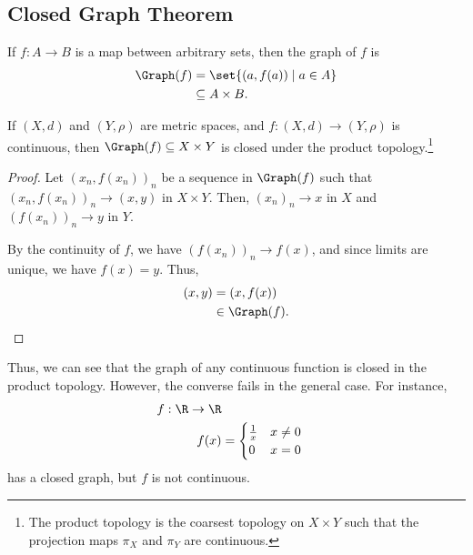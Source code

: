 \documentclass[10pt]{mypackage}
\begin{document}
  \subsection{Closed Graph Theorem}%
  \begin{definition}
    If $f: A\rightarrow B$ is a map between arbitrary sets, then the graph of $f$ is
    \begin{align*}
      \Graph(f) &= \set{\left(a,f(a)\right)\mid a\in A}\\
                &\subseteq A\times B.
    \end{align*}
  \end{definition}
  \begin{proposition}
    If $\left(X,d\right)$ and $\left(Y,\rho\right)$ are metric spaces, and $f: \left(X,d\right)\rightarrow \left(Y,\rho\right)$ is continuous, then $\Graph(f) \subseteq X\times Y$ is closed under the product topology.\footnote{The product topology is the coarsest topology on $X\times Y$ such that the projection maps $\pi_X$ and $\pi_Y$ are continuous.}
  \end{proposition}
  \begin{proof}
    Let $\left(x_n,f\left(x_n\right)\right)_n$ be a sequence in $\Graph(f)$ such that $\left(x_n,f\left(x_n\right)\right)_n\rightarrow \left(x,y\right)$ in $X\times Y$. Then, $\left(x_n\right)_n \rightarrow x$ in $X$ and $\left(f\left(x_n\right)\right)_n\rightarrow y$ in $Y$.\newline

    By the continuity of $f$, we have $\left(f\left(x_n\right)\right)_n\rightarrow f(x)$, and since limits are unique, we have $f(x) = y$. Thus,
    \begin{align*}
      \left(x,y\right) &= \left(x,f(x)\right)\\
                       &\in \Graph(f).
    \end{align*}
  \end{proof}
  Thus, we can see that the graph of any continuous function is closed in the product topology. However, the converse fails in the general case. For instance,
  \begin{align*}
    f: \R\rightarrow \R\\
    f(x) &= \begin{cases}
      \frac{1}{x} & x\neq 0\\
      0 & x = 0
    \end{cases}
  \end{align*}
  has a closed graph, but $f$ is not continuous.\newline
\end{document}
